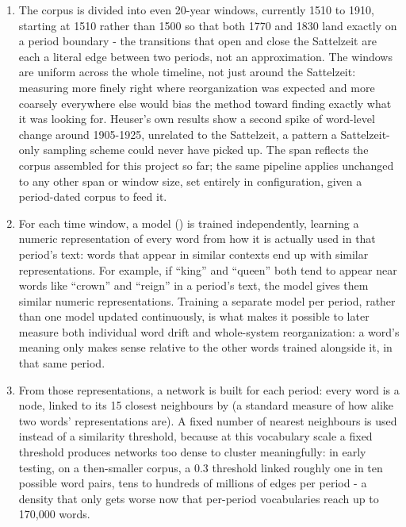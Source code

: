 \documentclass[11pt]{article}
\begin{document}
\begin{enumerate}

  \item {} The corpus is
    divided into even 20-year windows, currently 1510 to 1910, starting at
    1510 rather than 1500 so that both 1770 and 1830 land exactly on a
    period boundary - the transitions that open and close the Sattelzeit
    are each a literal edge between two periods, not an approximation. The
    windows are uniform across the whole timeline, not just around the
    Sattelzeit: measuring more finely right where reorganization was
    expected and more coarsely everywhere else would bias the method
    toward finding exactly what it was looking for. Heuser's own results
    show a second spike of word-level change around 1905-1925, unrelated
    to the Sattelzeit, a pattern a Sattelzeit-only sampling scheme could
    never have picked up. The span reflects the corpus assembled for this
    project so far; the same pipeline applies unchanged to any other span
    or window size, set entirely in configuration, given a period-dated
    corpus to feed it.

  \item {} For each time window,
    a model () is trained independently, learning a
    numeric representation of every word from how it is actually used in
    that period's text: words that appear in similar contexts end up with
    similar representations. For example, if ``king'' and ``queen'' both
    tend to appear near words like ``crown'' and ``reign'' in a period's
    text, the model gives them similar numeric representations. Training
    a separate model per period, rather
    than one model updated continuously, is what makes it possible to
    later measure both individual word drift and whole-system
    reorganization: a word's meaning only makes sense relative to the
    other words trained alongside it, in that same period.

  \item {} From those
    representations, a network is built for each period: every word is a
    node, linked to its 15 closest neighbours by  (a standard measure of how alike two words'
    representations are). A fixed number of nearest neighbours is used
    instead of a similarity threshold, because at this vocabulary scale a
    fixed threshold produces networks too dense to cluster meaningfully:
    in early testing, on a then-smaller corpus, a 0.3 threshold linked
    roughly one in ten possible word pairs, tens to hundreds of millions
    of edges per period - a density that only gets worse now that
    per-period vocabularies reach up to 170{,}000 words.


\end{enumerate}
\end{document}
